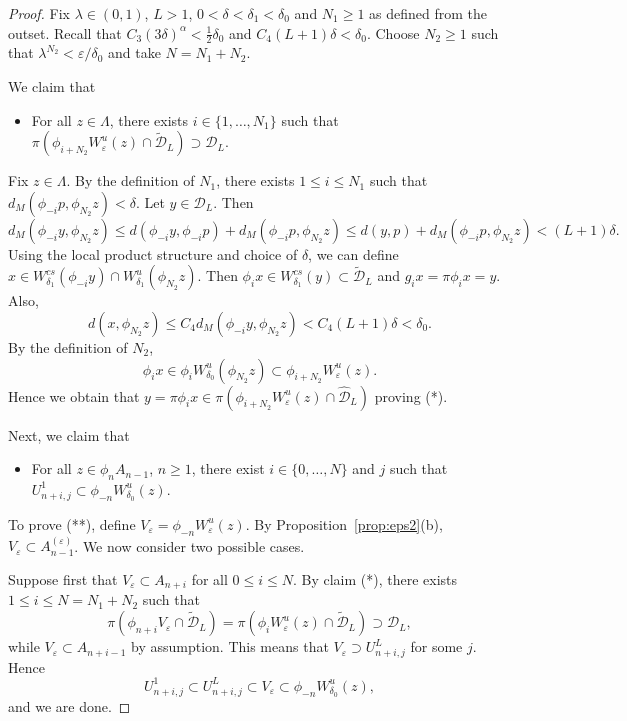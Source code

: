 \documentclass[10pt,a4paper]{amsart}
\newcommand{\cD}{{\mathcal D}}
\newcommand{\eps}{\varepsilon}
\newcommand{\hcD}{{\widehat {\mathcal D}}}
\newcommand{\tcD}{{\widetilde {\mathcal D}}}
\begin{document}
\begin{proof}
Fix $\lambda\in(0,1)$, $L>1$, $0<\delta<\delta_1<\delta_0$ and $N_1\ge1$ as defined from the outset.
Recall that $C_3(3\delta)^\alpha<\frac12\delta_0$ and $C_4(L+1)\delta<\delta_0$.
Choose $N_2\ge1$ such that $\lambda^{N_2}<\eps/\delta_0$ and take $N=N_1+N_2$.

We claim that
\begin{itemize}
\item[(*)]
For all $z\in \Lambda$, there exists $i\in\{1,\dots,N_1\}$ such that
$\pi (\phi_{i+N_2} W^u_\eps(z)\cap \tcD_L)\supset \cD_L$.
\end{itemize}

Fix $z\in \Lambda$.
By the definition of $N_1$, there exists $1\le i\le N_1$ such that $d_M(\phi_{-i}p,\phi_{N_2}z)<\delta$.
Let $y\in \cD_L$. Then
\[
d_M(\phi_{-i}y,\phi_{N_2}z)\le 
d(\phi_{-i}y,\phi_{-i}p)+d_M(\phi_{-i}p,\phi_{N_2}z)\le d(y,p)+d_M(\phi_{-i}p,\phi_{N_2}z)<(L+1)\delta.
\]
Using the local product structure and choice of $\delta$, we can
define $x\in W^{cs}_{\delta_1}(\phi_{-i}y)\cap W^u_{\delta_1}(\phi_{N_2}z)$.
Then $\phi_ix\in W^{cs}_{\delta_1}(y)\subset\tcD_L$ and
$g_ix=\pi \phi_ix=y$.
Also,
\[
d(x, \phi_{N_2}z)\le C_4d_M(\phi_{-i}y,\phi_{N_2}z)
<C_4(L+1)\delta<\delta_0.
\]
By the definition of $N_2$,
\[
\phi_ix\in \phi_i W^u_{\delta_0}(\phi_{N_2}z)
\subset \phi_{i+N_2} W^u_\eps(z).
\]
Hence we obtain that
$y=\pi \phi_ix\in \pi(\phi_{i+N_2}W^u_\eps(z)\cap\hcD_L)$
proving (*).

Next, we claim that 
\begin{itemize}
\item[(**)] 
For all $z\in \phi_nA_{n-1}$, $n\ge1$, there 
exist $i\in\{0,\dots,N\}$ and $j$ such that $U_{n+i,j}^1\subset \phi_{-n}W^u_{\delta_0}(z)$.
\end{itemize}

To prove (**), define $V_\eps=\phi_{-n}W^u_\eps(z)$.
By Proposition~\ref{prop:eps2}(b),
$V_\eps\subset A_{n-1}^{(\eps)}$.
We now consider two possible cases.

Suppose first that $V_\eps\subset A_{n+i}$ for all $0\le i\le N$.
By claim (*), there exists $1\le i\le N=N_1+N_2$ such that 
\[
\pi(\phi_{n+i}V_\eps\cap \tcD_L)=\pi(\phi_iW^u_\eps(z)\cap \tcD_L)\supset \cD_L,
\]
while $V_\eps\subset A_{n+i-1}$ by assumption.
This means that $V_\eps\supset U_{n+i,j}^L$ for some $j$. Hence
\[
U_{n+i,j}^1\subset U_{n+i,j}^L\subset V_\eps\subset  \phi_{-n}W^u_{\delta_0}(z),
\]
  and we are done.


\end{proof}
\end{document}
